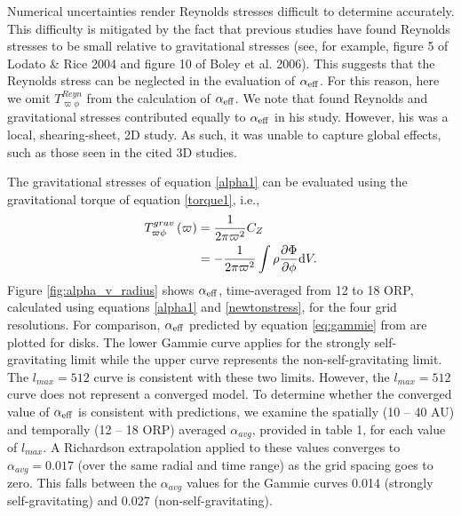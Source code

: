 \documentclass[manuscript]{aastex}
\begin{document}
  

Numerical uncertainties render Reynolds stresses difficult to determine accurately. 
This difficulty is mitigated by the fact that 
previous studies have found Reynolds stresses to be small relative to gravitational stresses (see, 
for example, figure 5 of Lodato \& Rice 2004 and figure 10 of Boley et al. 2006).  This  suggests that the Reynolds stress
can be neglected in the evaluation of $\alpha_{\rm{eff}}$.   For this reason, 
here we omit
$T_{\varpi\phi}^{Reyn}$ from the calculation of $\alpha_{\rm{eff}}$. 
We note that \cite{gammie2001}  found
Reynolds and gravitational stresses contributed equally to $\alpha_{\rm{eff}}$ in his study.  However,
his was a local, shearing-sheet, 2D study.  As such, it was unable to capture global effects, such
as those seen in the cited 3D studies.  


The gravitational stresses of equation \eqref{alpha1} can be evaluated using the gravitational torque of equation \eqref{torque1}, i.e.,
\begin{equation}
\label{newtonstress}
\begin{split}
 T_{\varpi\phi}^{grav}\left( \varpi \right) & = \frac{1}{2\pi\varpi^2}C_Z\\
                                & = - \frac{1}{2\pi\varpi^2} \int \rho\frac{\partial\Phi}{\partial\phi} {\rm d}V.
\end{split}
\end{equation}
Figure \ref{fig:alpha_v_radius} shows $\alpha_{\rm{eff}}$, time-averaged from 12 to 18 ORP, calculated using equations \eqref{alpha1} and \eqref{newtonstress},
for the four grid resolutions.  For comparison, 
$\alpha_{\rm{eff}}$ predicted by equation \eqref{eq:gammie} from \citet{gammie2001} are plotted for disks.  The lower  Gammie curve applies for the strongly self-gravitating limit while the upper curve 
represents the non-self-gravitating limit.   The $l_{max} = 512$ curve is consistent with these two limits.  However, 
the  $l_{max} = 512$ curve does not represent a converged model.
To determine whether the converged value of $\alpha_{\rm{eff}}$ is consistent with predictions, we examine 
the spatially (10 -- 40 AU) and temporally (12 -- 18 ORP) averaged  $\alpha_{avg}$,
provided in table 1, for each value of  $l_{max}$. A Richardson extrapolation applied to these values  
converges to $\alpha_{avg} = 0.017$ (over the same radial  and time range)
as the grid spacing goes to zero.   This falls
between the $\alpha_{avg}$ values for the Gammie curves 0.014 (strongly self-gravitating) and 0.027 (non-self-gravitating).
\end{document}
